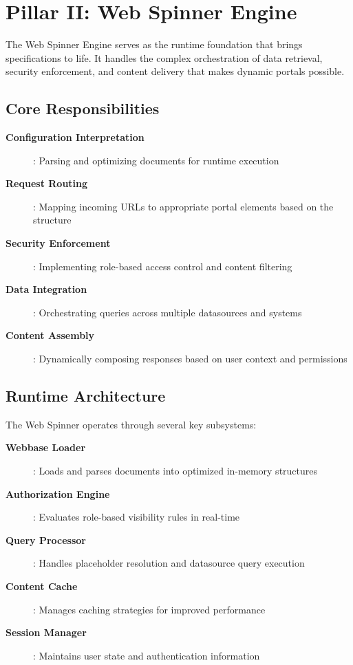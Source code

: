 \section{Pillar II: Web Spinner Engine}
\label{sec:pillar-spinner}

The Web Spinner Engine serves as the runtime foundation that brings \wbdl{} specifications to life. It handles the complex orchestration of data retrieval, security enforcement, and content delivery that makes dynamic portals possible.

\subsection{Core Responsibilities}

\begin{description}
\item[\textbf{Configuration Interpretation}]: Parsing and optimizing \wbdl{} documents for runtime execution
\item[\textbf{Request Routing}]: Mapping incoming URLs to appropriate portal elements based on the \webbase{} structure
\item[\textbf{Security Enforcement}]: Implementing role-based access control and content filtering
\item[\textbf{Data Integration}]: Orchestrating queries across multiple datasources and systems
\item[\textbf{Content Assembly}]: Dynamically composing responses based on user context and permissions
\end{description}

\subsection{Runtime Architecture}

The Web Spinner operates through several key subsystems:

\begin{description}
\item[\textbf{Webbase Loader}]: Loads and parses \wbdl{} documents into optimized in-memory structures
\item[\textbf{Authorization Engine}]: Evaluates role-based visibility rules in real-time
\item[\textbf{Query Processor}]: Handles \wbpl{} placeholder resolution and datasource query execution
\item[\textbf{Content Cache}]: Manages caching strategies for improved performance
\item[\textbf{Session Manager}]: Maintains user state and authentication information
\end{description}

